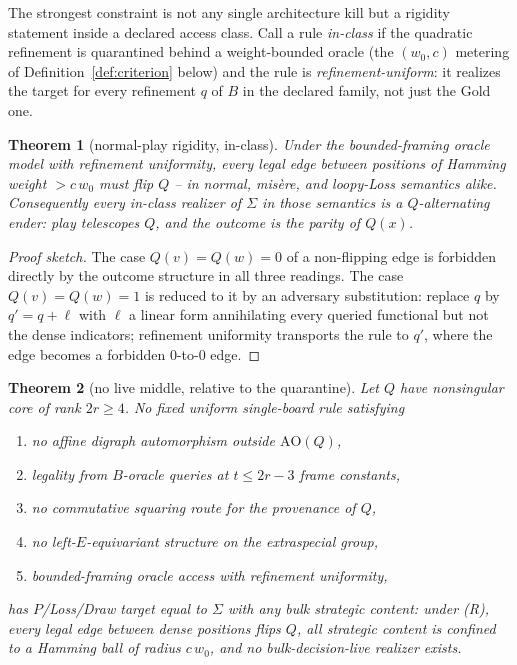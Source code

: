 \documentclass[11pt]{article}
\theoremstyle{plain}
\newtheorem{theorem}{Theorem}
\theoremstyle{definition}
\newcommand{\AO}{\mathrm{AO}}
\begin{document}
The strongest constraint is not any single architecture kill but a rigidity
statement inside a declared access class. Call a rule \emph{in-class} if the
quadratic refinement is quarantined behind a weight-bounded oracle (the
$(w_0,c)$ metering of Definition~\ref{def:criterion} below) and the rule is
\emph{refinement-uniform}: it realizes the target for every refinement $q$
of $B$ in the declared family, not just the Gold one.

\begin{theorem}[normal-play rigidity, in-class]\label{thm:rigidity}
Under the bounded-framing oracle model with refinement uniformity, every
legal edge between positions of Hamming weight $>c\,w_0$ must flip $Q$ --
in normal, misère, and loopy-Loss semantics alike. Consequently every
in-class realizer of $\Sigma$ in those semantics is a \emph{$Q$-alternating
ender}: play telescopes $Q$, and the outcome is the parity of $Q(x)$.
\end{theorem}

\begin{proof}[Proof sketch]
The case $Q(v)=Q(w)=0$ of a non-flipping edge is forbidden directly by the
outcome structure in all three readings. The case $Q(v)=Q(w)=1$ is reduced
to it by an adversary substitution: replace $q$ by $q'=q+\ell$ with $\ell$
a linear form annihilating every queried functional but not the dense
indicators; refinement uniformity transports the rule to $q'$, where the
edge becomes a forbidden $0$-to-$0$ edge.
\end{proof}

\begin{theorem}[no live middle, relative to the quarantine]\label{thm:nolivemiddle}
Let $Q$ have nonsingular core of rank $2r\geq4$. No fixed uniform
single-board rule satisfying
\begin{enumerate}[label=(\Alph*),leftmargin=*,itemsep=0pt]
\item[(S)] no affine digraph automorphism outside $\AO(Q)$,
\item[(A)] legality from $B$-oracle queries at $t\leq 2r-3$ frame constants,
\item[(C)] no commutative squaring route for the provenance of $Q$,
\item[(E)] no left-$E$-equivariant structure on the extraspecial group,
\item[(R)] bounded-framing oracle access with refinement uniformity,
\end{enumerate}
has $P$/Loss/Draw target equal to $\Sigma$ with any bulk strategic
content: under (R), every legal edge between dense positions flips $Q$, all
strategic content is confined to a Hamming ball of radius $c\,w_0$, and no
bulk-decision-live realizer exists.
\end{theorem}
\end{document}
